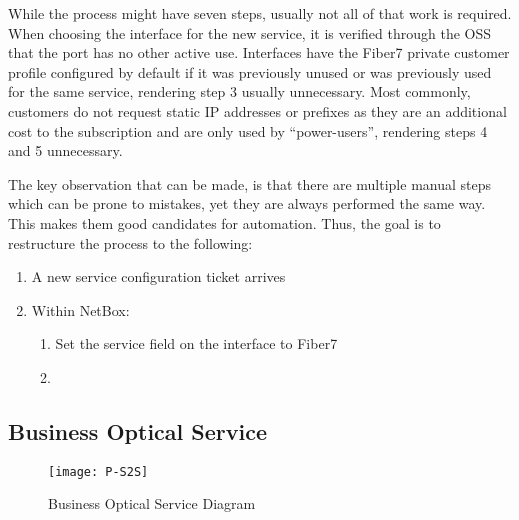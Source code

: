 While the process might have seven steps, usually not all of that work is required.
When choosing the interface for the new service, it is verified through the \acrshort{OSS}
that the port has no other active use.
Interfaces have the Fiber7 private customer profile configured by default
if it was previously unused or was previously used for the same service,
rendering step 3 usually unnecessary.
Most commonly, customers do not request static IP addresses or prefixes as
they are an additional cost to the subscription and are only used by ``power-users'',
rendering steps 4 and 5 unnecessary.

The key observation that can be made, is that there are multiple manual steps
which can be prone to mistakes, yet they are always performed the same way. This makes
them good candidates for automation. Thus, the goal is to restructure the process
to the following:

\begin{enumerate}
  \item A new service configuration ticket arrives
  \item Within NetBox:
  \begin{enumerate}
    \item Set the service field on the interface to Fiber7
    \item 
  \end{enumerate}
\end{enumerate}




\subsection{Business Optical Service}


\begin{figure}[h]
  \centering
  \texttt{[image: P-S2S]}
  \caption{Business Optical Service Diagram}
  \label{fig:s2s}
\end{figure}

